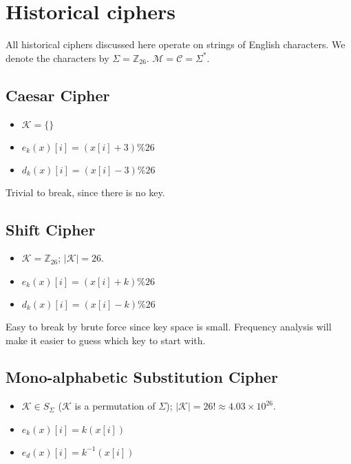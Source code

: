 \section{Historical ciphers}

All historical ciphers discussed here operate on strings of English characters.
We denote the characters by $\Sigma = \mathbb{Z}_{26}$.
$\mathcal{M} = \mathcal{C} = \Sigma^*$.

\subsection{Caesar Cipher}

\begin{itemize}
\item $\mathcal{K} = \{\}$
\item $e_k(x)[i] = (x[i]+3)\%26$
\item $d_k(x)[i] = (x[i]-3)\%26$
\end{itemize}

Trivial to break, since there is no key.

\subsection{Shift Cipher}

\begin{itemize}
\item $\mathcal{K} = \mathbb{Z}_{26}$; $|\mathcal{K}| = 26$.
\item $e_k(x)[i] = (x[i]+k)\%26$
\item $d_k(x)[i] = (x[i]-k)\%26$
\end{itemize}

Easy to break by brute force since key space is small.
Frequency analysis will make it easier to guess which key to start with.

\subsection{Mono-alphabetic Substitution Cipher}

\begin{itemize}
\item $\mathcal{K} \in S_{\Sigma}$ ($\mathcal{K}$ is a permutation of $\Sigma$);
  $|\mathcal{K}| = 26! \approx 4.03 \times 10^{26}$.
\item $e_k(x)[i] = k(x[i])$
\item $e_d(x)[i] = k^{-1}(x[i])$
\end{itemize}

